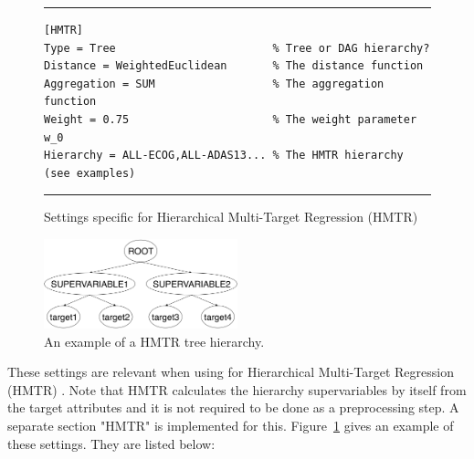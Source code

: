 \begin{figure}[tb]
\hrule\vspace{1em}
\begin{verbatim}
[HMTR]
Type = Tree                        % Tree or DAG hierarchy?
Distance = WeightedEuclidean       % The distance function
Aggregation = SUM                  % The aggregation function
Weight = 0.75                      % The weight parameter w_0
Hierarchy = ALL-ECOG,ALL-ADAS13... % The HMTR hierarchy (see examples)
\end{verbatim}
\hrule
\caption{Settings specific for Hierarchical Multi-Target Regression (HMTR)}
\label{settings-hmtr:fig}
\end{figure}

\begin{figure}[tb]
\centering
\includegraphics[width=0.5\textwidth]{fig/hmtr}
\caption{An example of a HMTR tree hierarchy.}
\label{settings-hmtrex:fig}
\end{figure}

These settings are relevant when using \clus{} for Hierarchical Multi-Target Regression (HMTR) \cite{Mileski2017:proc}. Note that HMTR calculates the hierarchy supervariables by itself from the target attributes and it is not required to be done as a preprocessing step. A separate section "HMTR" is implemented for this. Figure~\ref{settings-hmtr:fig} gives an example of these settings. They are listed below:



